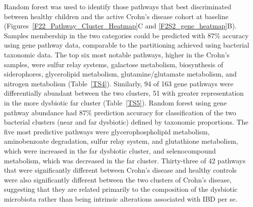 Random forest was used to identify those pathways that best discriminated between healthy children and the active Crohn's disease cohort at baseline (Figures~\ref{F22_Pathway_Cluster_Heatmap}C and \ref{F2S2_gene_heatmap}B). Samples membership in the two categories could be predicted with 87\% accuracy using gene pathway data, comparable to the partitioning achieved using bacterial taxonomic data. The top six most notable pathways, higher in the Crohn's samples, were sulfur relay systems, galactose metabolism, biosynthesis of siderophores, glycerolipid metabolism, glutamine/glutamate metabolism, and nitrogen metabolism (Table~\ref{TS4}). Similarly, 94 of 163 gene pathways were differentially abundant between the two clusters, 51 with greater representation in the more dysbiotic far cluster (Table~\ref{TS5}). Random forest using gene pathway abundance had 87\% prediction accuracy for classification of the two bacterial clusters (near and far dysbiotic) defined by taxonomic proportions. The five most predictive pathways were glycerophospholipid metabolism, aminobenzoate degradation, sulfur relay system, and glutathione metabolism, which were increased in the far dysbiotic cluster, and selenocompound metabolism, which was decreased in the far cluster. Thirty-three of 42 pathways that were significantly different between Crohn's disease and healthy controls were also significantly different between the two clusters of Crohn's disease, suggesting that they are related primarily to the composition of the dysbiotic microbiota rather than being intrinsic alterations associated with IBD per se. 


